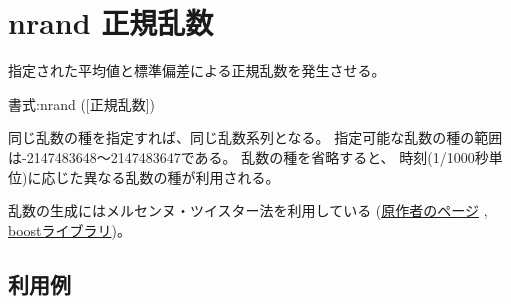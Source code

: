 
%

\section{nrand 正規乱数\label{sect:nrand}}
指定された平均値と標準偏差による正規乱数を発生させる。

書式:nrand ([正規乱数])

同じ乱数の種を指定すれば、同じ乱数系列となる。
指定可能な乱数の種の範囲は-2147483648〜2147483647である。
乱数の種を省略すると、
時刻(1/1000秒単位)に応じた異なる乱数の種が利用される。

乱数の生成にはメルセンヌ・ツイスター法を利用している
(\href{http://www.math.sci.hiroshima-u.ac.jp/~m-mat/MT/emt.html}{原作者のページ}
, \href{http://www.boost.org/doc/libs/1_54_0/doc/html/boost_random.html}{boostライブラリ})。


\subsection*{利用例}


